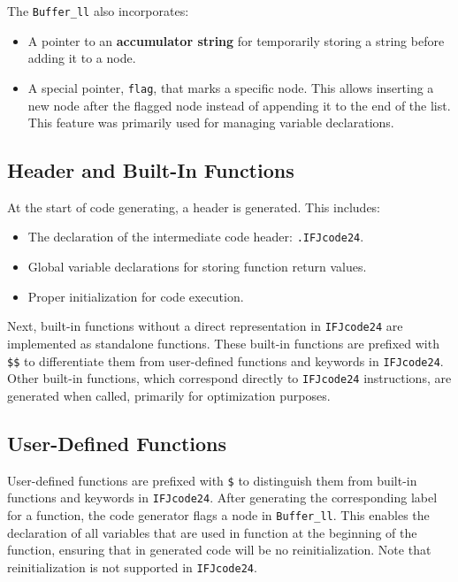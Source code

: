 \documentclass[a4paper, 11pt]{article}
\begin{document}
The \verb|Buffer_ll| also incorporates:
\begin{itemize}
    \item A pointer to an \textbf{accumulator string} for temporarily storing a string before adding it to a node.
    \item A special pointer, \verb|flag|, that marks a specific node. This allows inserting a new node after the flagged node instead of appending it to the end of the list. This feature was primarily used for managing variable declarations.
\end{itemize}


\subsection{Header and Built-In Functions}

At the start of code generating, a header is generated. This includes:
\begin{itemize}
    \item The declaration of the intermediate code header: \verb|.IFJcode24|.
    \item Global variable declarations for storing function return values.
    \item Proper initialization for code execution.
\end{itemize}

Next, built-in functions without a direct representation in \verb|IFJcode24| are implemented as standalone functions. These built-in functions are prefixed with \verb|$$| to differentiate them from user-defined functions and keywords in \verb |IFJcode24|. Other built-in functions, which correspond directly to \verb|IFJcode24| instructions, are generated when called, primarily for optimization purposes.

\subsection{User-Defined Functions}

User-defined functions are prefixed with \verb|$| to distinguish them from built-in functions and keywords in \verb|IFJcode24|. After generating the corresponding label for a function, the code generator flags a node in \verb|Buffer_ll|. This enables the declaration of all variables that are used in function at the beginning of the function, ensuring that in generated code will be no reinitialization. Note that reinitialization is not supported in \verb|IFJcode24|. 
\end{document}

